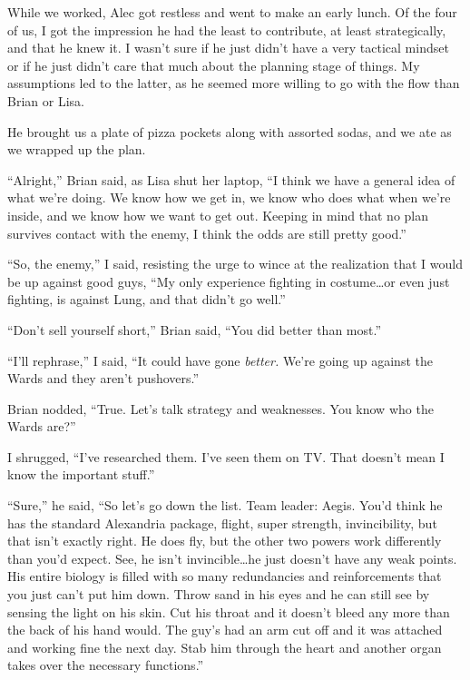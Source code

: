 While we worked, Alec got restless and went to make an early lunch. Of the four of us, I got the impression he had the least to contribute, at least strategically, and that he knew it.  I wasn't sure if he just didn't have a very tactical mindset or if he just didn't care that much about the planning stage of things.  My assumptions led to the latter, as he seemed more willing to go with the flow than Brian or Lisa.



He brought us a plate of pizza pockets along with assorted sodas, and we ate as we wrapped up the plan.



``Alright,'' Brian said, as Lisa shut her laptop, ``I think we have a general idea of what we're doing.  We know how we get in, we know who does what when we're inside, and we know how we want to get out.  Keeping in mind that no plan survives contact with the enemy, I think the odds are still pretty good.''



``So, the enemy,'' I said, resisting the urge to wince at the realization that I would be up against good guys, ``My only experience fighting in costume\ldots or even just fighting, is against Lung, and that didn't go well.''



``Don't sell yourself short,'' Brian said, ``You did better than most.''



``I'll rephrase,'' I said, ``It could have gone \emph{better.}  We're going up against the Wards and they aren't pushovers.''



Brian nodded, ``True.  Let's talk strategy and weaknesses.  You know who the Wards are?''



I shrugged, ``I've researched them.  I've seen them on TV.  That doesn't mean I know the important stuff.''



``Sure,'' he said, ``So let's go down the list.  Team leader: Aegis.  You'd think he has the standard Alexandria package, flight, super strength, invincibility, but that isn't exactly right.  He does fly, but the other two powers work differently than you'd expect.  See, he isn't invincible\ldots he just doesn't have any weak points.  His entire biology is filled with so many redundancies and reinforcements that you just can't put him down.  Throw sand in his eyes and he can still see by sensing the light on his skin.  Cut his throat and it doesn't bleed any more than the back of his hand would.  The guy's had an arm cut off and it was attached and working fine the next day.  Stab him through the heart and another organ takes over the necessary functions.''



